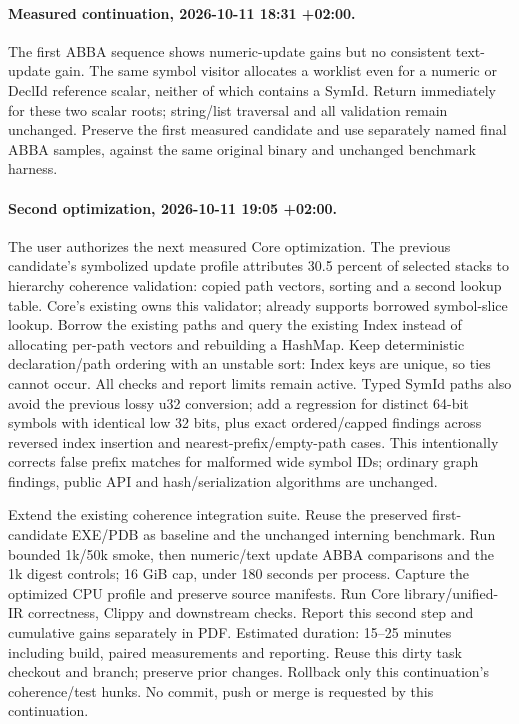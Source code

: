 \documentclass[11pt,a4paper]{article}
\begin{document}
\paragraph{Measured continuation, 2026-10-11 18:31 +02:00.}
The first ABBA sequence shows numeric-update gains but no consistent text-update
gain. The same symbol visitor allocates a worklist even for a numeric or DeclId
reference scalar, neither of which contains a SymId. Return immediately for these
two scalar roots; string/list traversal and all validation remain unchanged.
Preserve the first measured candidate and use separately named final ABBA samples,
against the same original binary and unchanged benchmark harness.

\paragraph{Second optimization, 2026-10-11 19:05 +02:00.}
The user authorizes the next measured Core optimization. The previous candidate's
symbolized update profile attributes 30.5 percent of selected stacks to hierarchy
coherence validation: copied path vectors, sorting and a second lookup table.
Core's existing  owns this validator;  already
supports borrowed symbol-slice lookup. Borrow the existing paths and query the
existing Index instead of allocating per-path vectors and rebuilding a HashMap.
Keep deterministic declaration/path ordering with an unstable sort: Index keys are
unique, so ties cannot occur. All checks and report limits remain active.
Typed SymId paths also avoid the previous lossy u32 conversion; add a regression
for distinct 64-bit symbols with identical low 32 bits, plus exact ordered/capped
findings across reversed index insertion and nearest-prefix/empty-path cases.
This intentionally corrects false prefix matches for malformed wide symbol IDs;
ordinary graph findings, public API and hash/serialization algorithms are unchanged.

Extend the existing coherence integration suite. Reuse the preserved first-candidate
EXE/PDB as baseline and the unchanged interning benchmark. Run bounded 1k/50k smoke,
then numeric/text update ABBA comparisons and the 1k digest controls; 16 GiB cap,
under 180 seconds per process. Capture the optimized CPU profile and preserve source
manifests. Run Core library/unified-IR correctness, Clippy and downstream checks.
Report this second step and cumulative gains separately in PDF. Estimated duration:
15--25 minutes including build, paired measurements and reporting. Reuse this dirty
task checkout and branch; preserve prior changes. Rollback only this continuation's
coherence/test hunks. No commit, push or merge is requested by this continuation.
\end{document}
